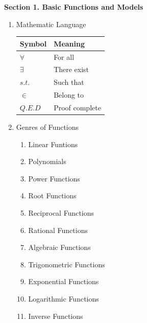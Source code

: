 \documentclass[12px]{article}
\begin{document}
\begin{center}
    \huge\textbf {Section 1. Basic Functions and Models}
\end{center}
\large\begin{enumerate}
    \item Mathematic Language
    \begin{table}[!ht]
        \centering
        \begin{tabular}[t]{p{5cm}<{\centering}p{5cm}<{\centering}}\toprule
            \textbf{Symbol} & \textbf{Meaning} \\ \midrule
            $\forall$ & For all \\ 
            $\exists$ & There exist \\ 
            $s.t.$ & Such that \\ 
            $\in$ & Belong to \\ 
            $Q.E.D$& Proof complete \\
            \bottomrule
         \end{tabular}
    \end{table}

    \item Genres of Functions
    \begin{multicols}{2}
        \begin{enumerate}[(1)]    
            \item Linear Funtions
            \item Polynomials
            \item Power Functions
            \item Root Functions
            \item Reciprocal Functions
            \item Rational Functions
            \item Algebraic Functions
            \item Trigonometric Functions
            \item Exponential Functions
            \item Logarithmic Functions
            \item Inverse Functions
        \end{enumerate}
    \end{multicols}


\end{enumerate}
\end{document}
